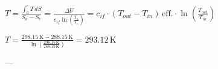 \( T = \frac{\int_{a}^{e} T \, dS}{S_a - S_e} = \frac{\Delta U}{c_{if} \ln \left( \frac{T_a}{T_e} \right)} = c_{if} \cdot (T_{out} - T_{in}) \, \text{eff.} \cdot \ln \left( \frac{T_{out}}{T_{in}} \right) \)  

\( T = \frac{298.15 \, \text{K} - 288.15 \, \text{K}}{\ln \left( \frac{298.15 \, \text{K}}{288.15 \, \text{K}} \right)} = 293.12 \, \text{K} \)  

---